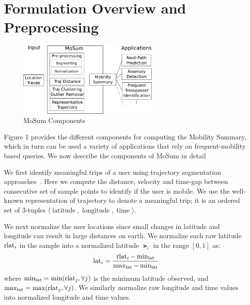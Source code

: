 \section{Formulation Overview and Preprocessing}
\begin{figure}[!htb]
\centering
\includegraphics[width=7cm]{figs/overview.pdf}
\caption{MoSum Components}
\label{fig:components}
\end{figure}

Figure 1 provides the different components for computing the Mobility Summary, which in turn can be used a variety of applications that rely on frequent-mobility based queries. We now describe the components of MoSum in detail


We first identify meaningful trips of a user using trajectory segmentation approaches~\cite{Zheng2008}. Here we compute the distance, velocity and time-gap between consecutive set of sample points to identify if the user is mobile. We use the well-known representation of trajectory to denote a meaningful trip; it is an ordered set of 3-tuples $\langle \operatorname{latitude},\operatorname{longitude},\operatorname{time} \rangle$.

We next normalize the user locations since small changes in latitude and longitude can result in large distances on earth. We normalize each raw latitude $\operatorname{rlat}_i$ in the sample into a normalized latitude $\lat_i$ in the range $[0,1]$ as:
\begin{eqnarray}
\operatorname{lat}_i =\frac{\operatorname{rlat}_i - \min_{\operatorname{lat}}}{\max_{\operatorname{lat}} - \min_{\operatorname{lat}}}
\end{eqnarray}
where $\min_{\operatorname{lat}}=\min(\operatorname{rlat}_j, \forall j)$ is the minimum latitude observed, and $\max_{\operatorname{lat}}=\max(\operatorname{rlat}_j, \forall j)$. We similarly normalize raw longitude and time values into normalized longitude and time values.

